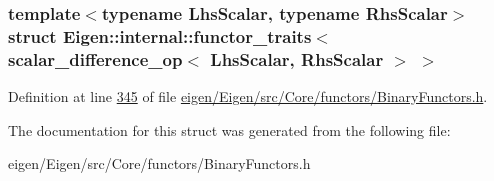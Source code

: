 \subsubsection*{template$<$typename Lhs\+Scalar, typename Rhs\+Scalar$>$\newline
struct Eigen\+::internal\+::functor\+\_\+traits$<$ scalar\+\_\+difference\+\_\+op$<$ Lhs\+Scalar, Rhs\+Scalar $>$ $>$}



Definition at line \hyperlink{eigen_2_eigen_2src_2_core_2functors_2_binary_functors_8h_source_l00345}{345} of file \hyperlink{eigen_2_eigen_2src_2_core_2functors_2_binary_functors_8h_source}{eigen/\+Eigen/src/\+Core/functors/\+Binary\+Functors.\+h}.



The documentation for this struct was generated from the following file\+:\begin{DoxyCompactItemize}
\item 
eigen/\+Eigen/src/\+Core/functors/\+Binary\+Functors.\+h\end{DoxyCompactItemize}

